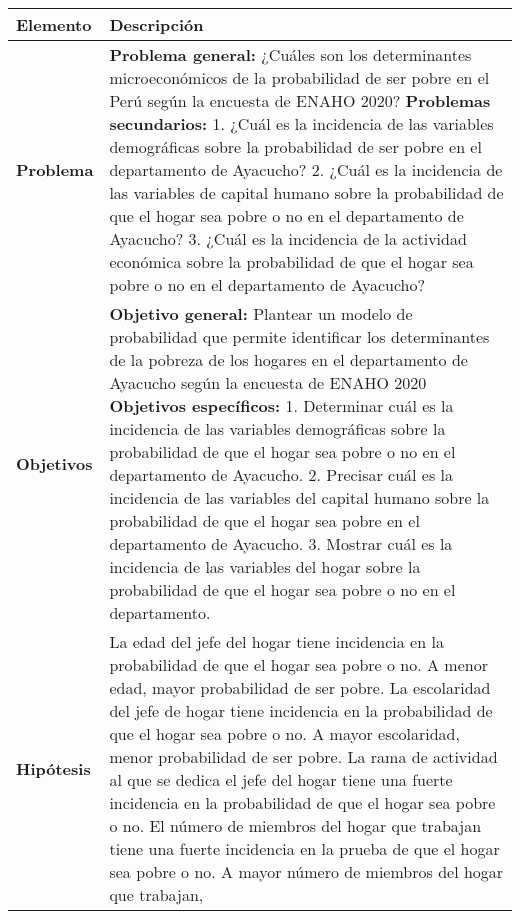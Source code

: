 \documentclass[
  man,
  floatsintext,
  longtable,
  a4paper,
  nolmodern,
  notxfonts,
  notimes,
  colorlinks=true,linkcolor=blue,citecolor=blue,urlcolor=blue]{apa7}
\begin{document}
\begin{longtable}[]{@{}
  >{\raggedright\arraybackslash}p{}
  >{\raggedright\arraybackslash}p{}@{}}
\toprule\noalign{}
\begin{minipage}[b]{\linewidth}\raggedright
Elemento
\end{minipage} & \begin{minipage}[b]{\linewidth}\raggedright
Descripción
\end{minipage} \\
\midrule\noalign{}
\endhead
\bottomrule\noalign{}
\endlastfoot
\textbf{Problema} & \textbf{Problema general:} ¿Cuáles son los
determinantes microeconómicos de la probabilidad de ser pobre en el Perú
según la encuesta de ENAHO 2020? \textbf{Problemas secundarios:} 1.
¿Cuál es la incidencia de las variables demográficas sobre la
probabilidad de ser pobre en el departamento de Ayacucho? 2. ¿Cuál es la
incidencia de las variables de capital humano sobre la probabilidad de
que el hogar sea pobre o no en el departamento de Ayacucho? 3. ¿Cuál es
la incidencia de la actividad económica sobre la probabilidad de que el
hogar sea pobre o no en el departamento de Ayacucho? \\
\textbf{Objetivos} & \textbf{Objetivo general:} Plantear un modelo de
probabilidad que permite identificar los determinantes de la pobreza de
los hogares en el departamento de Ayacucho según la encuesta de ENAHO
2020 \textbf{Objetivos específicos:} 1. Determinar cuál es la incidencia
de las variables demográficas sobre la probabilidad de que el hogar sea
pobre o no en el departamento de Ayacucho. 2. Precisar cuál es la
incidencia de las variables del capital humano sobre la probabilidad de
que el hogar sea pobre en el departamento de Ayacucho. 3. Mostrar cuál
es la incidencia de las variables del hogar sobre la probabilidad de que
el hogar sea pobre o no en el departamento. \\
\textbf{Hipótesis} & La edad del jefe del hogar tiene incidencia en la
probabilidad de que el hogar sea pobre o no. A menor edad, mayor
probabilidad de ser pobre. La escolaridad del jefe de hogar tiene
incidencia en la probabilidad de que el hogar sea pobre o no. A mayor
escolaridad, menor probabilidad de ser pobre. La rama de actividad al
que se dedica el jefe del hogar tiene una fuerte incidencia en la
probabilidad de que el hogar sea pobre o no. El número de miembros del
hogar que trabajan tiene una fuerte incidencia en la prueba de que el
hogar sea pobre o no. A mayor número de miembros del hogar que trabajan,

\end{longtable}
\end{document}
